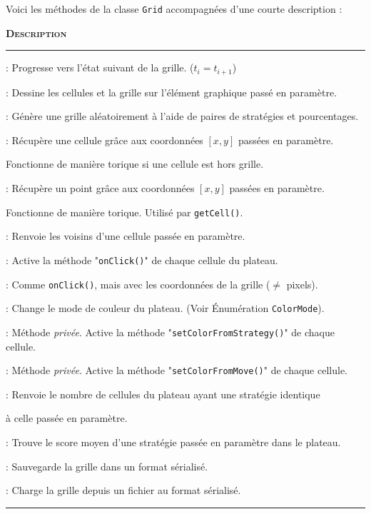 \documentclass[a4paper, french]{article}
\begin{document}
Voici les méthodes de la classe \texttt{Grid} accompagnées d'une courte description : 
\vspace{0.25cm}
\begin{description}[labelwidth=4cm]
    \small
    \item[\textbf{\textsc{Méthode}}] \textbf{\textsc{Description}}
    \vspace{0.1cm}
    \hrule{}
    \item[\texttt{step()}] : Progresse vers l'état suivant de la grille. ($t_{i} = t_{i+1}$)
    \item[\texttt{draw()}] :  Dessine les cellules et la grille sur l'élément graphique passé en paramètre.
    \item[\texttt{generate()}] :  Génère une grille aléatoirement à l'aide de paires de stratégies et pourcentages.
    \item[\texttt{getCell()}] : Récupère une cellule grâce aux coordonnées $[x, y]$ passées en paramètre.
    \item[]\hspace{2.5pt} Fonctionne de manière torique si une cellule est hors grille.
    \item[\texttt{getPointClampedInGrid()}] : Récupère un point grâce aux coordonnées $[x, y]$ passées en paramètre.
    \item[]\hspace{2.5pt} Fonctionne de manière torique. Utilisé par \texttt{getCell()}.
    \item[\texttt{findCellNeighbors()}] :  Renvoie les voisins d'une cellule passée en paramètre.
    \item[\texttt{onClick()}] : Active la méthode "\texttt{onClick()}" de chaque cellule du plateau.
    \item[\texttt{setStrategy()}] : Comme \texttt{onClick()}, mais avec les coordonnées de la grille ($\neq$ pixels).
    \item[\texttt{setColorMode()}] :  Change le mode de couleur du plateau. (Voir Énumération \texttt{ColorMode}).
    \item[\texttt{setColorFromStrategy()}] :  Méthode \textit{privée}. Active la méthode "\texttt{setColorFromStrategy()}" de chaque cellule.
    \item[\texttt{setColorFromMove()}] :  Méthode \textit{privée}. Active la méthode "\texttt{setColorFromMove()}" de chaque cellule.
    \item[\texttt{findCountOfStrategy()}] : Renvoie le nombre de cellules du plateau ayant une stratégie identique 
    \item[]\hspace{2.5pt} à celle passée en paramètre.
    \item[\texttt{findAvgScoreOfStrategy()}] :  Trouve le score moyen d'une stratégie passée en paramètre dans le plateau.
    \item[\texttt{saveData()}] : Sauvegarde la grille dans un format sérialisé.
    \item[\texttt{loadData()}] : Charge la grille depuis un fichier au format sérialisé.
\end{description}
\vspace{0.25cm}
\hrule{}
\vspace{0.5cm}
\pagebreak
\end{document}
